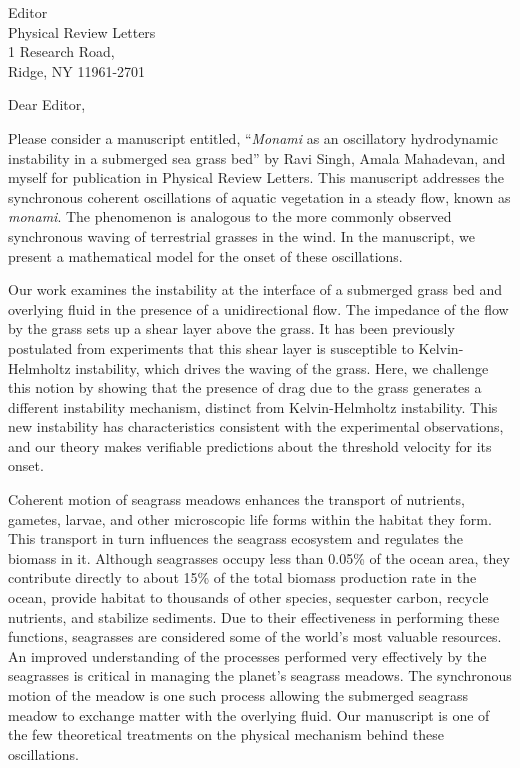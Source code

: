\documentclass[10pt]{letter}
\date{\today}
\begin{document}
\begin{letter}{
Editor \\
Physical Review Letters \\
1 Research Road, \\
Ridge, NY 11961-2701 
}
\opening{Dear Editor,}

Please consider a manuscript entitled, ``{\it Monami} as an oscillatory hydrodynamic instability in a submerged sea grass bed'' by Ravi Singh, Amala Mahadevan, and myself for publication in  Physical Review Letters. This manuscript addresses the synchronous coherent oscillations of aquatic vegetation in a steady flow, known as {\it monami}. The phenomenon is analogous to the more commonly observed synchronous waving of terrestrial grasses in the wind. In the manuscript, we present a mathematical model for the onset of these oscillations.

Our work examines the instability at the interface of a submerged grass bed and overlying fluid in the presence of a unidirectional flow.  The impedance of the flow by the grass sets up a shear layer above the grass.   It has been previously postulated from experiments that this shear layer is susceptible to  Kelvin-Helmholtz instability, which drives the waving of the grass.  Here, we challenge this notion by  showing that the presence of drag due to the grass generates a different instability mechanism, distinct from Kelvin-Helmholtz instability. This new instability has characteristics consistent with the experimental observations, and our theory makes verifiable predictions about the threshold velocity for its onset.

Coherent motion of seagrass meadows enhances the transport of nutrients, gametes, larvae, and other microscopic life forms within the habitat they form. This transport in turn influences the seagrass ecosystem and regulates the biomass in it. Although seagrasses occupy less than 0.05\% of the ocean area, they contribute directly to about 15\% of the total biomass production rate in the ocean, provide habitat to thousands of other species, sequester carbon, recycle nutrients, and stabilize sediments. Due to their effectiveness in performing these functions, seagrasses are considered some of the world's most valuable resources. An improved understanding of the processes performed very effectively by the seagrasses is critical in managing the planet's seagrass meadows. The synchronous motion of the meadow is one such process allowing the submerged seagrass meadow to exchange matter with the overlying fluid. Our manuscript is one of the few theoretical treatments on the physical mechanism behind these oscillations. 


\end{letter}
\end{document}
